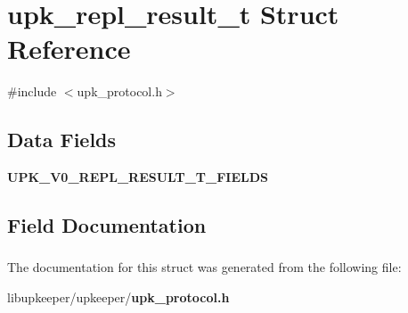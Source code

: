 \section{upk\_\-repl\_\-result\_\-t Struct Reference}
\label{structupk__repl__result__t}


{\ttfamily \#include $<$upk\_\-protocol.h$>$}

\subsection*{Data Fields}
\begin{DoxyCompactItemize}
\item 
{\bf UPK\_\-V0\_\-REPL\_\-RESULT\_\-T\_\-FIELDS}
\end{DoxyCompactItemize}


\subsection{Field Documentation}
\subsubsection[{UPK\_\-V0\_\-REPL\_\-RESULT\_\-T\_\-FIELDS}]{}\label{structupk__repl__result__t_a01f0b780b7197ff655348942bcecf36e}


The documentation for this struct was generated from the following file:\begin{DoxyCompactItemize}
\item 
libupkeeper/upkeeper/{\bf upk\_\-protocol.h}\end{DoxyCompactItemize}
